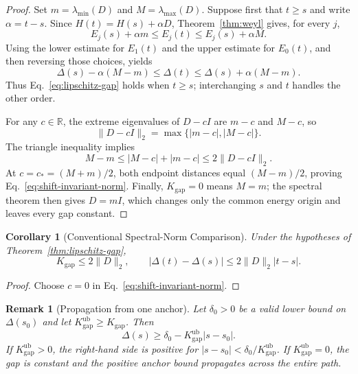\documentclass[11pt, a4paper]{article}
\newtheorem{remark}[theorem]{Remark}
\newtheorem{corollary}[theorem]{Corollary}
\newcommand{\norm}[1]{\| #1 \|}
\begin{document}
\begin{proof}
Set $m=\lambda_{\min}(D)$ and $M=\lambda_{\max}(D)$. Suppose first that $t\ge s$ and write $\alpha=t-s$. Since $H(t)=H(s)+\alpha D$, Theorem~\ref{thm:weyl} gives, for every $j$,
\begin{equation}
E_j(s)+\alpha m\le E_j(t)\le E_j(s)+\alpha M.
\end{equation}
Using the lower estimate for $E_1(t)$ and the upper estimate for $E_0(t)$, and then reversing those choices, yields
\begin{equation}
\Delta(s)-\alpha(M-m)
\le\Delta(t)\le
\Delta(s)+\alpha(M-m).
\end{equation}
Thus Eq.~\eqref{eq:lipschitz-gap} holds when $t\ge s$; interchanging $s$ and $t$ handles the other order.

For any $c\in\mathbb R$, the extreme eigenvalues of $D-cI$ are $m-c$ and $M-c$, so
\begin{equation}
\norm{D-cI}_2=\max\{|m-c|,|M-c|\}.
\end{equation}
The triangle inequality implies
\begin{equation}
M-m\le |M-c|+|m-c|\le2\norm{D-cI}_2.
\end{equation}
At $c=c_*=(M+m)/2$, both endpoint distances equal $(M-m)/2$, proving Eq.~\eqref{eq:shift-invariant-norm}. Finally, $K_{\mathrm{gap}}=0$ means $M=m$; the spectral theorem then gives $D=mI$, which changes only the common energy origin and leaves every gap constant.
\end{proof}

\begin{corollary}[Conventional Spectral-Norm Comparison]
\label{cor:conventional-gap-bound}
Under the hypotheses of Theorem~\ref{thm:lipschitz-gap},
\begin{equation}
K_{\mathrm{gap}}\le2\norm{D}_2,
\qquad
|\Delta(t)-\Delta(s)|\le2\norm{D}_2|t-s|.
\end{equation}
\end{corollary}
\begin{proof}
Choose $c=0$ in Eq.~\eqref{eq:shift-invariant-norm}.
\end{proof}

\begin{remark}[Propagation from one anchor]
Let $\delta_0>0$ be a valid lower bound on $\Delta(s_0)$ and let $K_{\mathrm{gap}}^{\mathrm{ub}}\ge K_{\mathrm{gap}}$. Then
\begin{equation}
\Delta(s)\ge\delta_0-K_{\mathrm{gap}}^{\mathrm{ub}}|s-s_0|.
\end{equation}
If $K_{\mathrm{gap}}^{\mathrm{ub}}>0$, the right-hand side is positive for $|s-s_0|<\delta_0/K_{\mathrm{gap}}^{\mathrm{ub}}$. If $K_{\mathrm{gap}}^{\mathrm{ub}}=0$, the gap is constant and the positive anchor bound propagates across the entire path.
\end{remark}
\end{document}

